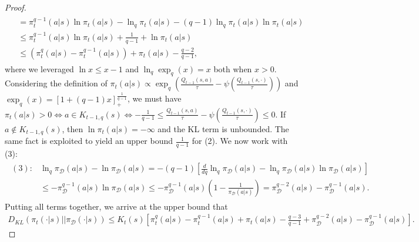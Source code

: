 \documentclass{article}
\newcommand{\AdaBracket}[1]{\left(#1\right)}
\newcommand{\AdaRectBracket}[1]{\left[#1\right]}
\newcommand{\KLany}[2]{D_{\!K\!L}\!\left(#1 \left|  \right| #2 \right)}
\newcommand{\datasetPolicy}{\pi_{\mathcal{D}}}
\begin{document}
\begin{proof}
\begin{align}
\begin{split}
        &= \pi_{t}^{q-1}(a|s)\ln\pi_t(a|s) - \ln_q\pi_t(a|s) - (q-1)\ln_q\pi_t(a|s)\ln\pi_t(a|s)\\
        & \leq \pi_{t}^{q-1}(a|s)\ln\pi_t(a|s) + \frac{1}{q-1} + \ln\pi_t (a|s)\\
        & \leq  \AdaBracket{ \pi_{t}^{q}(a|s) - \pi_{t}^{q-1} (a|s) } + \pi_t(a|s) - \frac{q-2}{q-1},
    \end{split}
\end{align}
where we leveraged $\ln x \leq x - 1$ and  $\ln_q\exp_q(x) = x$ both when $x>0$.
Considering the definition of $\pi_t(a|s) \propto \exp_q\AdaBracket{\frac{Q_{t-1}(s,a)}{\tau} - {\psi}\AdaBracket{\frac{Q_{t-1}(s,\cdot)}{\tau}}}$ and $\exp_q(x) = \AdaRectBracket{1 + (q-1)x}_{+}^{\frac{1}{q-1}}$, we must have  $\pi_t(a|s) > 0 \Leftrightarrow a\in K_{t-1,q}(s) \Leftrightarrow -\frac{1}{q-1} \leq \frac{Q_{t-1}(s,a)}{\tau} - {\psi}\AdaBracket{\frac{Q_{t-1}(s,\cdot)}{\tau}} \leq 0$. 
If $a \notin K_{t-1,q}(s)$, then $\ln\pi_t(a|s) = -\infty$ and the KL term is unbounded.
The same fact is exploited to yield an upper bound $\frac{1}{q-1}$  for (2).
We now work with (3):
\begin{align}
    \begin{split}
        (3): &\ln_q \datasetPolicy(a|s) - \ln\datasetPolicy(a|s) = -(q-1) \AdaRectBracket{\frac{d}{dq}\ln_q \datasetPolicy(a|s) - \ln_q\datasetPolicy(a|s)\ln\datasetPolicy(a|s)}\\
        & \leq -\datasetPolicy^{q-1}(a|s)\ln\datasetPolicy(a|s)  \leq  -\datasetPolicy^{q-1}(a|s)\AdaBracket{1 - \frac{1}{\datasetPolicy(a|s)} } = \datasetPolicy^{q-2}(a|s) - \datasetPolicy^{q-1}(a|s).
    \end{split}
\end{align}
Putting all terms together, we arrive at the upper bound that 
\begin{align*}
    \KLany{\pi_t(\cdot|s)}{\datasetPolicy(\cdot|s)} \leq K_{t}(s)\! \AdaRectBracket{  { \pi_{t}^{q}(a|s) - \pi_{t}^{q-1} (a|s) } + \pi_t(a|s) - \frac{q-3}{q-1}  + \datasetPolicy^{q-2}(a|s) - \datasetPolicy^{q-1}(a|s)}.
\end{align*}

\end{proof}
\end{document}
